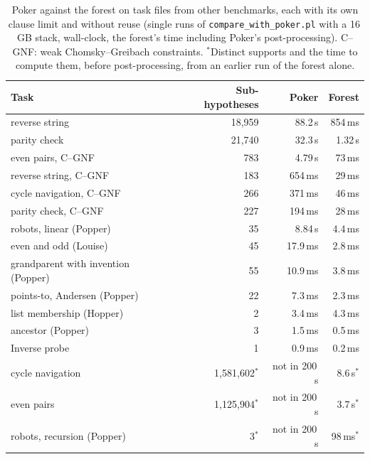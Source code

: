 \documentclass[11pt]{article}
\begin{document}
\begin{table}[ht]
\centering
\small
\begin{tabular}{lrrr}
\toprule
Task & Sub-hypotheses & Poker & Forest\\
\midrule
reverse string                      & 18,959 & 88.2\,s  & 854\,ms\\
parity check                        & 21,740 & 32.3\,s  & 1.32\,s\\
even pairs, C--GNF                  & 783    & 4.79\,s  & 73\,ms\\
reverse string, C--GNF              & 183    & 654\,ms  & 29\,ms\\
cycle navigation, C--GNF            & 266    & 371\,ms  & 46\,ms\\
parity check, C--GNF                & 227    & 194\,ms  & 28\,ms\\
robots, linear (Popper)             & 35     & 8.84\,s  & 4.4\,ms\\
even and odd (Louise)               & 45     & 17.9\,ms & 2.8\,ms\\
grandparent with invention (Popper) & 55     & 10.9\,ms & 3.8\,ms\\
points-to, Andersen (Popper)        & 22     & 7.3\,ms  & 2.3\,ms\\
list membership (Hopper)            & 2      & 3.4\,ms  & 4.3\,ms\\
ancestor (Popper)                   & 3      & 1.5\,ms  & 0.5\,ms\\
Inverse probe                       & 1      & 0.9\,ms  & 0.2\,ms\\
\midrule
cycle navigation                    & 1,581,602$^*$ & not in 200\,s & 8.6\,s$^*$\\
even pairs                          & 1,125,904$^*$ & not in 200\,s & 3.7\,s$^*$\\
robots, recursion (Popper)          & 3$^*$  & not in 200\,s & 98\,ms$^*$\\
\bottomrule
\end{tabular}
\caption{Poker against the forest on task files from other benchmarks, each with its
own clause limit and without reuse (single runs of \nolinkurl{compare_with_poker.pl}
with a 16\,GB stack, wall-clock, the forest's time including Poker's
post-processing). C--GNF: weak Chomsky--Greibach constraints. $^*$Distinct supports
and the time to compute them, before post-processing, from an earlier run of the
forest alone.}
\label{tab:survey}
\end{table}
\end{document}
